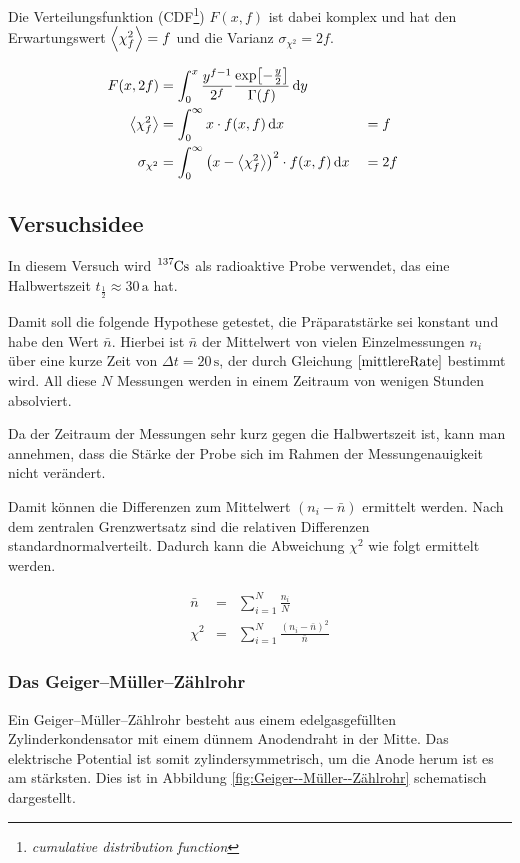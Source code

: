 \documentclass[12pt,a4paper]{scrartcl}
\numberwithin{equation}{section} %
\begin{document}
Die Verteilungsfunktion (CDF\footnote{\emph{cumulative distribution function}}) \(F(x, f)\) ist dabei komplex und hat den Erwartungswert \(\expval{\chi_f^2}=f\) und die Varianz \(\sigma_{\chi^2}=2f\).

\begin{align}
    F(x, 2f) &=
        \int_0^x
            \frac{y^{f-1}}{2^f}
                \frac{\exp[-\frac{y}{2}]}{\Gamma(f)}
            \,\mathrm dy \\
    \expval{\chi_f^2} &=
        \int_0^\infty x\cdot f(x, f)
            \,\mathrm dx
        &&= f \\
    \sigma_{\chi^2} &=
        \int_0^\infty \left(x - \expval{\chi_f^2}\right)^2 \cdot f(x, f)
            \,\mathrm dx
         &&=2f
\end{align}

\hypertarget{versuchsidee}{%
\subsection{Versuchsidee}\label{versuchsidee}}

In diesem Versuch wird \(\ce{^{137}Cs}\) als radioaktive Probe verwendet, das eine Halbwertszeit \(t_\frac{1}{2}\approx 30\,\mathrm a\) hat.

Damit soll die folgende Hypothese getestet, die Präparatstärke sei konstant und habe den Wert \(\bar n\). Hierbei ist \(\bar n\) der Mittelwert von vielen Einzelmessungen \(n_i\) über eine kurze Zeit von \(\Delta t=20\,\mathrm s\), der durch Gleichung \(\eqref{mittlereRate}\) bestimmt wird. All diese \(N\) Messungen werden in einem Zeitraum von wenigen Stunden absolviert.

Da der Zeitraum der Messungen sehr kurz gegen die Halbwertszeit ist, kann man annehmen, dass die Stärke der Probe sich im Rahmen der Messungenauigkeit nicht verändert.

Damit können die Differenzen zum Mittelwert \((n_i-\bar n)\) ermittelt werden. Nach dem zentralen Grenzwertsatz sind die relativen Differenzen standardnormalverteilt. Dadurch kann die Abweichung \(\chi^2\) wie folgt ermittelt werden.

\begin{eqnarray}
    \bar n &=& \sum_{i=1}^N \frac{n_i}{N} \label{mittlereRate} \\
    \chi^2 &=& \sum_{i=1}^N \frac{(n_i-\bar n)^2}{\bar n} \label{ChiSquared}
\end{eqnarray}

\subsubsection{Das Geiger--Müller--Zählrohr}
\label{Geiger--Müller--Zählrohr}
Ein Geiger--Müller--Zählrohr besteht aus einem edelgasgefüllten Zylinderkondensator mit einem dünnem Anodendraht in der Mitte. Das elektrische Potential ist somit zylindersymmetrisch, um die Anode herum ist es am stärksten. Dies ist in Abbildung \ref{fig:Geiger--Müller--Zählrohr} schematisch dargestellt.
\end{document}
